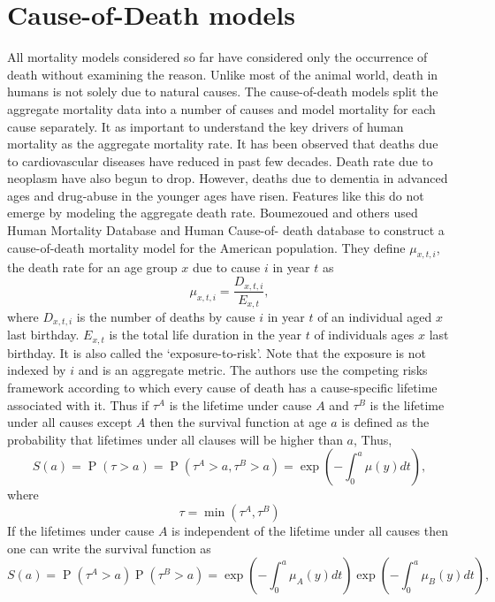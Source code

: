 \documentclass{article}
\numberwithin{equation}{section}
\DeclareMathOperator{\pr}{P}
\begin{document}
\section{Cause-of-Death models}\label{s11}
All mortality models considered so far have considered only the occurrence of
death without examining the reason. Unlike most of the animal world, death in
humans is not solely due to natural causes. The cause-of-death models split the
aggregate mortality data into a number of causes and model mortality for each
cause separately. It as important to understand the key drivers of human 
mortality as the aggregate mortality rate. It has been observed that deaths
due to cardiovascular diseases have reduced in past few decades. Death rate
due to neoplasm have also begun to drop. However, deaths due to dementia in 
advanced ages and drug-abuse in the younger ages have risen. Features like this
do not emerge by modeling the aggregate death rate. Boumezoued and others
\cite{alexandre2019modeling} used Human Mortality Database and Human Cause-of-
death database to construct a cause-of-death mortality model for the American
population. They define $\mu_{x,t,i}$, the death rate for an age group $x$ due
to cause $i$ in year $t$ as
\begin{equation}\label{s11e1}
\mu_{x,t,i} = \frac{D_{x,t,i}}{E_{x,t}},
\end{equation}
where $D_{x,t,i}$ is the number of deaths by cause $i$ in year $t$ of an 
individual aged $x$ last birthday. $E_{x,t}$ is the total life duration in the
year $t$ of individuals ages $x$ last birthday. It is also called the 
`exposure-to-risk'. Note that the exposure is not indexed by $i$ and is an
aggregate metric. The authors use the competing risks framework according to
which every cause of death has a cause-specific lifetime associated with  it.
Thus if $\tau^A$ is the lifetime under cause $A$ and $\tau^B$ is the lifetime
under all causes except $A$ then the survival function at age $a$ is defined
as the probability that lifetimes under all clauses will be higher than $a$,
Thus,
\begin{equation}\label{s11e2}
S(a) = \pr(\tau > a) = \pr(\tau^A>a,\tau^B>a) = 
\exp\left(-\int_0^a\mu(y)dt\right),
\end{equation}
where
\begin{equation}\label{s11e3}
\tau = \min(\tau^A, \tau^B)
\end{equation}
If the lifetimes under cause $A$ is independent of the lifetime under all causes
then one can write the survival function as
\begin{equation}\label{s11e4}
S(a) = \pr(\tau^A>a)\pr(\tau^B>a)=
\exp\left(-\int_0^a\mu_A(y)dt\right)\exp\left(-\int_0^a\mu_B(y)dt\right),
\end{equation}
\end{document}
